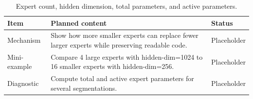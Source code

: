 \begin{table}[H]
\centering
\caption{Expert count, hidden dimension, total parameters, and active parameters.}
\label{tab:ch08-fine-grained-routed-expert-segmentation}
\begin{tabularx}{\textwidth}{p{}X p{}}
\toprule
Item & Planned content & Status \\
\midrule
Mechanism & Show how more smaller experts can replace fewer larger experts while preserving readable code. & Placeholder \\
Mini-example & Compare 4 large experts with hidden-dim=1024 to 16 smaller experts with hidden-dim=256. & Placeholder \\
Diagnostic & Compute total and active expert parameters for several segmentations. & Placeholder \\
\bottomrule
\end{tabularx}
\end{table}
